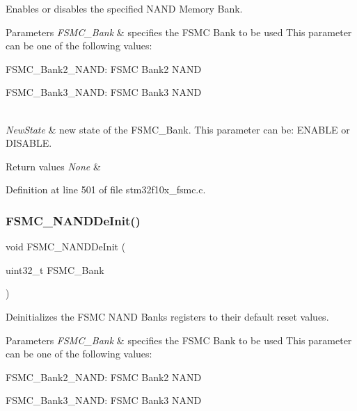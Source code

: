 Enables or disables the specified N\+A\+ND Memory Bank. 


\begin{DoxyParams}{Parameters}
{\em F\+S\+M\+C\+\_\+\+Bank} & specifies the F\+S\+MC Bank to be used This parameter can be one of the following values\+: \begin{DoxyItemize}
\item F\+S\+M\+C\+\_\+\+Bank2\+\_\+\+N\+A\+ND\+: F\+S\+MC Bank2 N\+A\+ND \item F\+S\+M\+C\+\_\+\+Bank3\+\_\+\+N\+A\+ND\+: F\+S\+MC Bank3 N\+A\+ND \end{DoxyItemize}
\\
\hline
{\em New\+State} & new state of the F\+S\+M\+C\+\_\+\+Bank. This parameter can be\+: E\+N\+A\+B\+LE or D\+I\+S\+A\+B\+LE. \\
\hline
\end{DoxyParams}

\begin{DoxyRetVals}{Return values}
{\em None} & \\
\hline
\end{DoxyRetVals}


Definition at line 501 of file stm32f10x\+\_\+fsmc.\+c.

\mbox{\label{group___f_s_m_c___private___functions_gafb749503293474a68555961bd8f120e1}} 
\subsubsection{\texorpdfstring{F\+S\+M\+C\+\_\+\+N\+A\+N\+D\+De\+Init()}{FSMC\_NANDDeInit()}}
{\footnotesize\ttfamily void F\+S\+M\+C\+\_\+\+N\+A\+N\+D\+De\+Init (\begin{DoxyParamCaption}\item[{uint32\+\_\+t}]{F\+S\+M\+C\+\_\+\+Bank }\end{DoxyParamCaption})}



Deinitializes the F\+S\+MC N\+A\+ND Banks registers to their default reset values. 


\begin{DoxyParams}{Parameters}
{\em F\+S\+M\+C\+\_\+\+Bank} & specifies the F\+S\+MC Bank to be used This parameter can be one of the following values\+: \begin{DoxyItemize}
\item F\+S\+M\+C\+\_\+\+Bank2\+\_\+\+N\+A\+ND\+: F\+S\+MC Bank2 N\+A\+ND \item F\+S\+M\+C\+\_\+\+Bank3\+\_\+\+N\+A\+ND\+: F\+S\+MC Bank3 N\+A\+ND \end{DoxyItemize}
\\
\hline
\end{DoxyParams}

